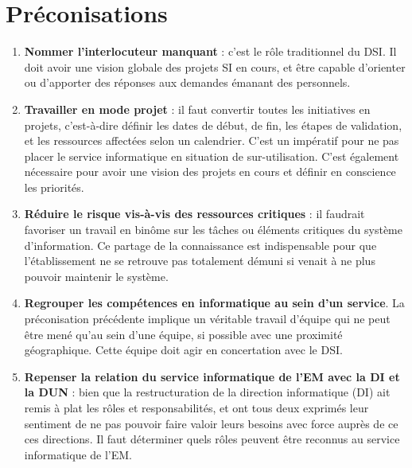 \documentclass{book}
\begin{document}
\section{Préconisations}

\begin{enumerate}
\item	\textbf{Nommer l'interlocuteur manquant} : c'est le rôle traditionnel du DSI. Il doit
avoir une vision globale des projets SI en cours, et être capable d'orienter ou 
d'apporter des réponses aux demandes émanant des personnels.\\

\item \textbf{Travailler en mode projet} : il faut convertir toutes les initiatives en projets,
c'est-à-dire définir les dates de début, de fin, les étapes de validation, et les ressources
affectées selon un calendrier. C'est un impératif pour ne pas placer le service informatique
en situation de sur-utilisation. C'est également nécessaire pour avoir une vision des projets
en cours et définir en conscience les priorités.\\

\item \textbf{Réduire le risque vis-à-vis des ressources critiques} : il faudrait favoriser
un travail en binôme sur les tâches ou éléments critiques du système d'information. Ce 
partage de la connaissance est indispensable pour que l'établissement ne se retrouve pas
totalement démuni si \CK venait à ne plus pouvoir maintenir le système.\\

\item \textbf{Regrouper les compétences en informatique au sein d'un service}. 
La préconisation précédente implique un véritable travail d'équipe qui ne peut être mené
qu'au sein d'une équipe, si possible avec une proximité géographique. Cette équipe
doit agir en concertation avec le DSI.\\

\item \textbf{Repenser la relation du service informatique de l'EM avec la DI et la DUN} :
bien que la restructuration de la direction informatique (DI) ait remis à plat
les rôles et responsabilités, \CK et \NB ont tous deux exprimés leur sentiment de
ne pas pouvoir faire valoir leurs besoins avec force auprès de ce ces directions.
Il faut déterminer quels rôles peuvent être reconnus au service informatique de l'EM.\\




\end{enumerate}
\end{document}
